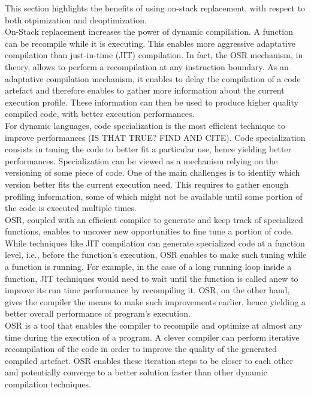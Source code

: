 This section highlights the benefits of using on-stack replacement, with respect to both otpimization and deoptimization.\\

On-Stack replacement increases the power of dynamic compilation.
A function can be recompile while it is executing.
This enables more aggressive adaptative compilation than just-in-time (JIT) compilation.
In fact, the OSR mechanism, in theory, allows to perform a recompilation at any instruction boundary. 
As an adaptative compilation mechanism, it enables to delay the compilation of a code artefact and therefore enables to gather more information about the current execution profile.
These information can then be used to produce higher quality compiled code, with better execution performances.\\

For dynamic languages, code specialization is the most efficient technique to improve performances (IS THAT TRUE? FIND AND CITE).
Code specialization consists in tuning the code to better fit a particular use, hence yielding better performances.
Specialization can be viewed as a mechanism relying on the versioning of some piece of code.
One of the main challenges is to identify which version better fits the current execution need.
This requires to gather enough profiling information, some of which might not be available until some portion of the code is executed multiple times.\\

OSR, coupled with an efficient compiler to generate and keep track of specialized functions, enables to uncover new opportunities to fine tune a portion of code.
While techniques like JIT compilation can generate specialized code at a function level, i.e., before the function's execution, OSR enables to make such tuning while a function is running.
For example, in the case of a long running loop inside a function, JIT techniques would need to wait until the function is called anew to improve its run time performance by recompiling it. 
OSR, on the other hand, gives the compiler the means to make such improvements earlier, hence yielding a better overall performance of program's execution.\\

OSR is a tool that enables the compiler to recompile and optimize at almost any time during the execution of a program.
A clever compiler can perform iterative recompilation of the code in order to improve the quality of the generated compiled artefact.
OSR enables these iteration steps to be closer to each other and potentially converge to a better solution faster than other dynamic compilation techniques.\\


